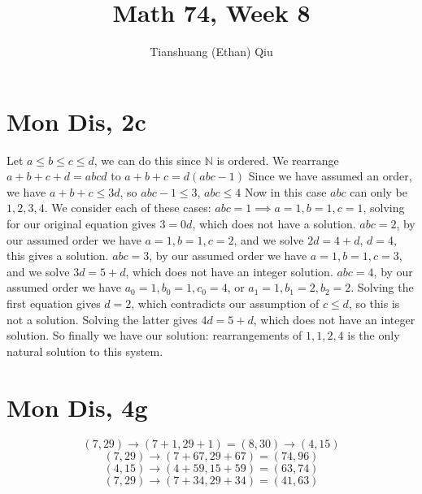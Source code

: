 \documentclass[12pt]{article}
\author{Tianshuang (Ethan) Qiu}
\newcommand{\N}{\mathbb{N}}
\begin{document}
\title{Math 74, Week 8}
\maketitle

\section{Mon Dis, 2c}
Let $a\leq b \leq c \leq d$, we can do this since $\N$ is ordered. We rearrange $a+b+c+d = abcd$ to $a+b+c = d(abc-1)$
\newline
Since we have assumed an order, we have $a+b+c \leq 3d$, so $abc-1 \leq 3$, $abc \leq 4$
\newline
Now in this case $abc$ can only be $1,2,3,4$. We consider each of these cases:
\newline
$abc = 1 \implies a=1, b=1, c=1$, solving for our original equation gives $3 = 0d$, which does not have a solution.
\newline
$abc = 2$, by our assumed order we have $a=1, b=1, c=2$, and we solve $2d=4+d$, $d=4$, this gives a solution.
\newline
$abc = 3$, by our assumed order we have $a=1, b=1, c=3$, and we solve $3d=5+d$, which does not have an integer solution.
\newline
$abc = 4$, by our assumed order we have $a_0=1, b_0=1, c_0=4$, or $a_1=1, b_1 = 2, b_2=2$. Solving the first equation gives $d = 2$, which contradicts our assumption of $c \leq d$, so this is not a solution. Solving the latter gives $4d = 5+d$, which does not have an integer solution.
\newline
So finally we have our solution: rearrangements of $1,1,2,4$ is the only natural solution to this system.

\section{Mon Dis, 4g}
$$(7,29) \to (7+1,29+1) = (8, 30) \to (4, 15)$$
$$(7,29) \to (7+67, 29+67) = (74, 96)$$
$$(4,15) \to (4+59, 15+59) = (63, 74)$$
$$(7,29) \to (7+34, 29+34) = (41, 63)$$
\end{document}
